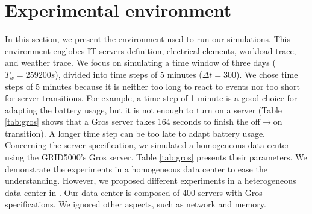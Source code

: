 \section{Experimental environment}
\label{sec:experiment_environment}

In this section, we present the environment used to run our simulations. This environment englobes IT servers definition, electrical elements, workload trace, and weather trace. We focus on simulating a time window of three days ($T_{w}=259200 s$), divided into time steps of 5 minutes ($\Delta t=300$). We chose time steps of 5 minutes because it is neither too long to react to events nor too short for server transitions. For example, a time step of 1 minute is a good choice for adapting the battery usage, but it is not enough to turn on a server (Table \ref{tab:gros} shows that a Gros server takes 164 seconds to finish the off$\rightarrow$on transition). A longer time step can be too late to adapt battery usage. Concerning the server specification, we simulated a homogeneous data center using the GRID5000's Gros server. Table \ref{tab:gros} presents their parameters. We demonstrate the experiments in a homogeneous data center to ease the understanding. However, we proposed different experiments in a heterogeneous data center in \cite{de2022analyzing}. Our data center is composed of 400 servers with Gros specifications. We ignored other aspects, such as network and memory. 

